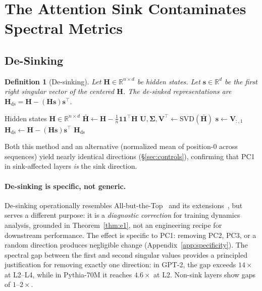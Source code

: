 \documentclass[11pt]{article}
\newtheorem{definition}{Definition}
\begin{document}
\section{The Attention Sink Contaminates Spectral Metrics}\label{sec:theory}

\subsection{De-Sinking}\label{sec:desink}

\begin{definition}[De-sinking]
Let $\mathbf{H} \in \mathbb{R}^{n \times d}$ be hidden states.
Let $\mathbf{s} \in \mathbb{R}^d$ be the first right singular vector of the centered $\mathbf{H}$.
The de-sinked representations are $\mathbf{H}_{\text{ds}} = \mathbf{H} - (\mathbf{H}\mathbf{s})\mathbf{s}^\top$.
\end{definition}

\begin{algorithm}[t]
\caption{De-sinking}\label{alg:desink}
\begin{algorithmic}[1]
\REQUIRE Hidden states $\mathbf{H} \in \mathbb{R}^{n \times d}$
\STATE $\bar{\mathbf{H}} \leftarrow \mathbf{H} - \frac{1}{n}\mathbf{1}\mathbf{1}^\top\mathbf{H}$ 
\STATE $\mathbf{U}, \mathbf{\Sigma}, \mathbf{V}^\top \leftarrow \text{SVD}(\bar{\mathbf{H}})$ 
\STATE $\mathbf{s} \leftarrow \mathbf{V}_{:,1}$ 
\STATE $\mathbf{H}_{\text{ds}} \leftarrow \mathbf{H} - (\mathbf{H}\mathbf{s})\mathbf{s}^\top$ 
\RETURN $\mathbf{H}_{\text{ds}}$
\end{algorithmic}
\end{algorithm}

Both this method and an alternative (normalized mean of position-0 across sequences) yield nearly identical directions (\S\ref{sec:controls}), confirming that PC1 in sink-affected layers \emph{is} the sink direction.

\paragraph{De-sinking is specific, not generic.}
De-sinking operationally resembles All-but-the-Top~\citep{mu2018allbutthetop} and its extensions~\citep{li2020bertflow,rajaee2021cluster}, but serves a different purpose: it is a \emph{diagnostic correction} for training dynamics analysis, grounded in Theorem~\ref{thm:e1}, not an engineering recipe for downstream performance.
The effect is specific to PC1: removing PC2, PC3, or a random direction produces negligible change (Appendix~\ref{app:specificity}).
The spectral gap between the first and second singular values provides a principled justification for removing exactly one direction: in GPT-2, the gap exceeds $14\times$ at L2--L4, while in Pythia-70M it reaches $4.6\times$ at L2.
Non-sink layers show gaps of $1$--$2\times$.
\end{document}
